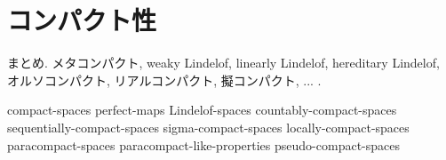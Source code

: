 \documentclass[uplatex, dvipdfmx, a4paper, 12pt, class=jsbook, crop=false]{standalone}
\begin{document}
\chapter{コンパクト性}
\label{chap:compactness}

まとめ.
メタコンパクト, weaky Lindelof, linearly Lindelof, hereditary Lindelof, オルソコンパクト, リアルコンパクト, 擬コンパクト, ... \WIP.

{compact-spaces}
{perfect-maps}
{Lindelof-spaces}
{countably-compact-spaces}
{sequentially-compact-spaces}
{sigma-compact-spaces}
{locally-compact-spaces}
{paracompact-spaces}
{paracompact-like-properties}
{pseudo-compact-spaces}
\end{document}
